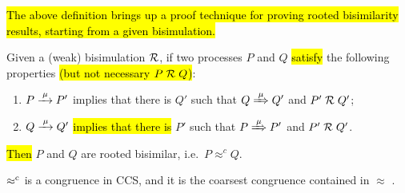 \hl{The above definition brings up a proof technique for proving rooted
bisimilarity results, starting from a given bisimulation.}
\begin{lemma}
\label{l:obsCongrByWeakBisim}
Given a (weak) bisimulation $\mathrel{\cal R}$, if two processes $P$ and $Q$
\hl{satisfy} the following properties \hl{(but not necessary $P\;{\cal R}\;Q$)}:
\begin{enumerate}
\item $P \arr\mu P'$ implies that there is $Q'$ such that $Q
   \Arr\mu Q'$ and $P' \mathrel{\cal R} Q'$;
\item $Q \arr\mu Q'$ \hl{implies that there is} $P'$ such that $P
   \Arr\mu P'$ and $P' \mathrel{\cal R} Q'$.
\end{enumerate}
\hl{Then} $P$ and $Q$ are rooted bisimilar, i.e.~$P \approx^c Q$.
\end{lemma}

\begin{theorem}
\label{t:rapproxCongruence}
$\mathrel{\approx^{\rm{c}}}$ is a congruence in CCS, and it is the
coarsest congruence contained in $\approx$ \cite{van2005characterisation}.
\end{theorem}

